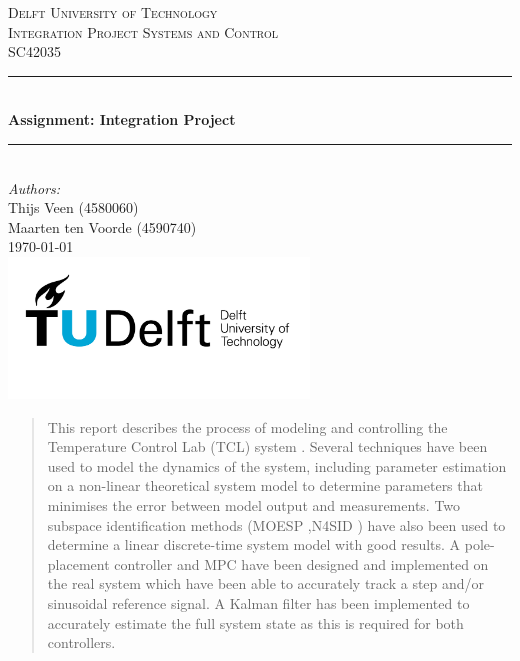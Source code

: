 \documentclass[a4paper]{article}
\begin{document}
\begin{titlepage}

\newcommand{\HRule}{\rule{\linewidth}{0.5mm}} 							%
\center 
 
\textsc{\LARGE Delft University of Technology}\\[1cm]

\textsc{\Large Integration Project Systems and Control}\\[0.2cm]
\textsc{\large SC42035}\\[1cm] 										%
\HRule \\[0.8cm]
{ \huge \bfseries Assignment: Integration Project}\\[0.7cm]								%
\HRule \\[2cm]
\large
\emph{Authors:}\\
Thijs Veen (4580060)\\
Maarten ten Voorde (4590740)\\[1.5cm]	%
{\large \today}\\[5cm]
\includegraphics[width=0.6\textwidth]{images/TU_delft_logo.jpg}\\[1cm] 	%
\vfill 
\end{titlepage}


\begin{abstract}
    This report describes the process of modeling and controlling the Temperature Control Lab (TCL) system \cite{APMonitor}. Several techniques have been used to model the dynamics of the system, including parameter estimation on a non-linear theoretical system model to determine parameters that minimises the error between model output and measurements. Two subspace identification methods (MOESP \cite{doi:10.1080/00207179208934364} ,N4SID \cite{VANOVERSCHEE199475}) have also been used to determine a linear discrete-time system model with good results. A pole-placement controller and MPC have been designed and implemented on the real system which have been able to accurately track a step and/or sinusoidal reference signal. A Kalman filter has been implemented to accurately estimate the full system state as this is required for both controllers.      
\end{abstract}
\end{document}
